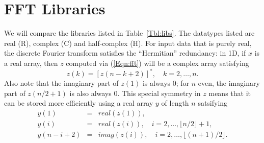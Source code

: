 \documentclass[a4]{article}
\begin{document}
\section{FFT Libraries}\label{Sec:libs}

We will compare the libraries listed in Table~\ref{Tbl:libs}. The datatypes listed are real (R), complex (C) and half-complex (H). For input data that is purely real, the discrete Fourier transform satisfies the ``Hermitian'' redundancy: in 1D, if $x$ is a real array, then $z$ computed via (\ref{Eqn:fft}) will be a complex array satisfying
$$z(k) = \left[z(n-k+2)\right]^*, \quad k=2,\ldots,n.$$ Also note that the imaginary part of $z(1)$ is always 0; for $n$ even, the imaginary part of $z(n/2 + 1) $ is also always 0. This special symmetry in $z$ means that it can be stored more efficiently using a real array $y$ of length $n$ satsifying
\begin{eqnarray*}
y(1) & = & real(z(1)),\\
y(i) & = & real(z(i)), \quad i=2,\ldots,\lfloor n/2 \rfloor +1,\\
y(n-i+2) & = & imag(z(i)), \quad i=2,\ldots, \lfloor (n+1)/2  \rfloor.
\end{eqnarray*} 
\end{document}
